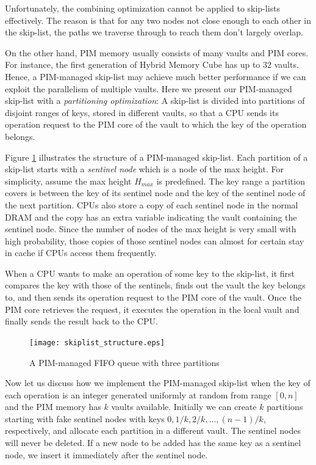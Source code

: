Unfortunately, the combining optimization cannot be applied to skip-lists effectively.
The reason is that for any two nodes not close enough to each other in the skip-list,
the paths we traverse through to reach them don't largely overlap.

On the other hand, PIM memory usually consists of many vaults and PIM cores.
For instance, the first generation of Hybrid Memory Cube \cite{website:HMC} has up to 32 vaults.
Hence, a PIM-managed skip-list may achieve much better performance if
we can exploit the parallelism of multiple vaults.
Here we present our PIM-managed skip-list with a \emph{partitioning optimization}:
A skip-list is divided into partitions of disjoint ranges of keys,
stored in different vaults, so that a CPU sends its operation request to
the PIM core of the vault to which the key of the operation belongs.

Figure \ref{figure:skiplist_structure} illustrates the structure of a PIM-managed skip-list.
Each partition of a skip-list starts with a \emph{sentinel node}
which is a node of the max height. 
For simplicity, assume the max height $H_{max}$ is predefined.
The key range a partition covers is between the key of its sentinel node and
the key of the sentinel node of the next partition.
CPUs also store a copy of each sentinel node in the normal DRAM and 
the copy has an extra variable indicating the vault containing the sentinel node.
Since the number of nodes of the max height is very small with high probability, 
those copies of those sentinel nodes can almost for certain stay in cache
if CPUs access them frequently.

When a CPU wants to make an operation of some key to the skip-list,
it first compares the key with those of the sentinels, finds out the vault
the key belongs to, and then sends its operation request to the PIM core of the vault.
Once the PIM core retrieves the request, it executes the operation in the local vault 
and finally sends the result back to the CPU.


\begin{figure}[ht!]
\centering
\texttt{[image: skiplist\_structure.eps]}
\caption{A PIM-managed FIFO queue with three partitions}
\label{figure:skiplist_structure}
\end{figure}

Now let us discuss how we implement the PIM-managed skip-list
when the key of each operation is an integer generated uniformly at random
from range $[0, n]$ and the PIM memory has $k$ vaults available.
Initially we can create $k$ partitions starting with fake sentinel nodes
with keys $0, 1/k, 2/k,..., (n-1)/k$, respectively, 
and allocate each partition in a different vault. 
The sentinel nodes will never be deleted.
If a new node to be added has the same key as a sentinel node,
we insert it immediately after the sentinel node.

